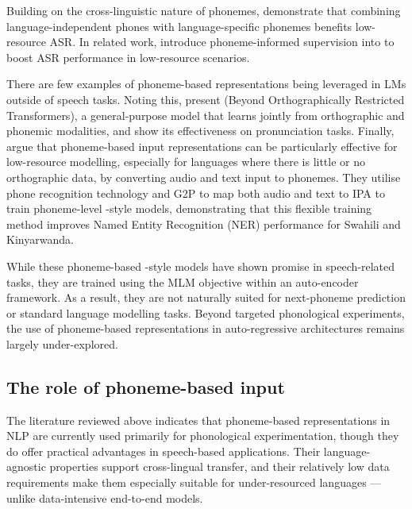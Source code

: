 Building on the cross-linguistic nature of phonemes, \citet{li2020universal} demonstrate that combining language-independent phones with language-specific phonemes benefits low-resource ASR. In related work, \citet{feng-2023-language-universal-phonetic} introduce phoneme-informed supervision into  to boost ASR performance in low-resource scenarios.

There are few examples of phoneme-based representations being leveraged in LMs outside of speech tasks. Noting this, \citet{gale-etal-2023-bort} present  (Beyond Orthographically Restricted Transformers), a general-purpose model that learns jointly from orthographic and phonemic modalities, and show its effectiveness on pronunciation tasks. Finally, \citet{leong-2022-phone} argue that phoneme-based input representations can be particularly effective for low-resource modelling, especially for languages where there is little or no orthographic data, by converting audio and text input to phonemes. They utilise phone recognition technology and G2P to map both audio and text to IPA to train phoneme-level \bert-style models, demonstrating that this flexible training method improves Named Entity Recognition (NER) performance for Swahili and Kinyarwanda. 


While these phoneme-based \bert-style models have shown promise in speech-related tasks, they are trained using the MLM objective within an auto-encoder framework. As a result, they are not naturally suited for next-phoneme prediction or standard language modelling tasks. Beyond targeted phonological experiments, the use of phoneme-based representations in auto-regressive architectures remains largely under-explored.

\subsection{The role of phoneme-based input}\label{sec:12-phoneval}

The literature reviewed above indicates that phoneme-based representations in NLP are currently used primarily for phonological experimentation, though they do offer practical advantages in speech-based applications. Their language-agnostic properties support cross-lingual transfer, and their relatively low data requirements make them especially suitable for under-resourced languages --- unlike data-intensive end-to-end models.

